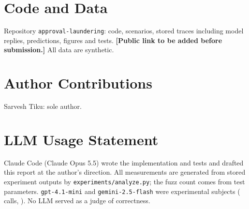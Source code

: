 \documentclass[10pt]{article}
\begin{document}
\vspace{-.7em}\section*{Code and Data}
Repository \texttt{approval-laundering}: code, scenarios, stored traces including model replies, predictions, figures and tests. \textbf{[Public link to be added before submission.]} All data are synthetic.

\vspace{-.7em}\section*{Author Contributions}
Sarvesh Tiku: sole author.

\vspace{-.7em}\section*{LLM Usage Statement}
Claude Code (Claude Opus 5.5) wrote the implementation and tests and drafted this report at the author's direction. All measurements are generated from stored experiment outputs by \texttt{experiments/analyze.py}; the fuzz count comes from test parameters. \texttt{gpt-4.1-mini} and \texttt{gemini-2.5-flash} were experimental subjects (\llmCalls{} calls, \llmCost{}). No LLM served as a judge of correctness.
\end{document}
